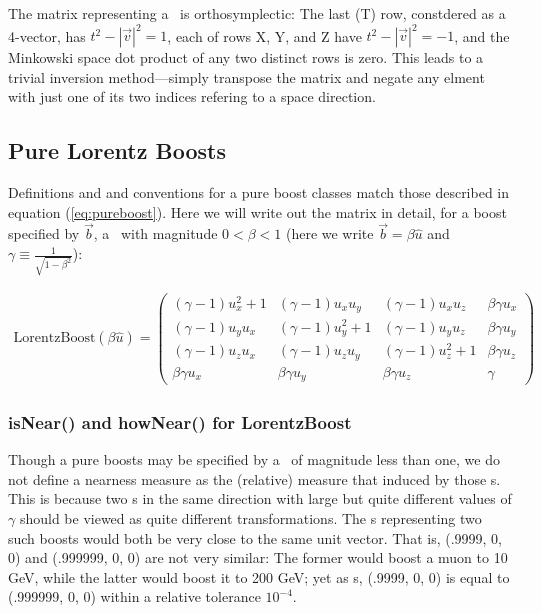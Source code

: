 The matrix representing a \LT\ is orthosymplectic:  The last (T) row,
constdered as a 4-vector, has $ t^2 - |\vec{v}|^2 = 1 $, each of rows
X, Y, and Z have $ t^2 - |\vec{v}|^2 = -1$, and the Minkowski space
dot product of any two distinct rows
is zero.  This leads to a trivial inversion method---simply transpose the
matrix and negate any elment with just one of its two indices refering to
a space direction.

\subsection{Pure Lorentz Boosts}

Definitions and
and conventions for a pure boost classes match those described in equation
(\ref{eq:pureboost}).
Here we will write out the matrix in detail, for a boost specified by
$\vec{b}$, a \SV\ with magnitude $0 < \beta < 1$ (here we write
$\vec{b} = \beta \hat{u} $ and
$\gamma \equiv \frac{1}{\sqrt{1-\beta^2}}$):

\begin{eqnarray}
\label{eq:boostform}
  \mbox{LorentzBoost}(\beta \hat{u}) =
  \left(
  \begin{array}{cccc}
  (\gamma - 1) u_x^2 + 1 & (\gamma - 1) u_x u_y &
  (\gamma - 1) u_x u_z & \beta \gamma u_x
	\\
  (\gamma - 1) u_y u_x & (\gamma - 1) u_y^2 + 1 &
  (\gamma - 1) u_y u_z & \beta \gamma u_y
	\\
  (\gamma - 1) u_z u_x & (\gamma - 1) u_z u_y &
  (\gamma - 1) u_z^2 + 1 & \beta \gamma u_z
	\\
  \beta \gamma u_x & \beta \gamma u_y & 
  \beta \gamma u_z & \gamma
  \end{array}
  \right)
\end{eqnarray}

\subsubsection{isNear() and howNear() for LorentzBoost}

Though a pure boosts may be specified by a \SV\ of magnitude less than one,
we do not define a nearness measure as the (relative) measure that induced
by those \SV s.  This is because two \LB s in the same direction
with large but quite different
values of $\gamma$ should be viewed as quite different transformations.
The \SV s representing two such boosts would both be very close to the same
unit vector.  That is, (.9999, 0, 0) and (.999999, 0, 0) are not very similar:
The former would boost a muon to 10 GeV, while the latter would boost it to
200 GeV; yet as \SV s, (.9999, 0, 0) is equal to (.999999, 0, 0) within
a relative tolerance $10^{-4}$.

